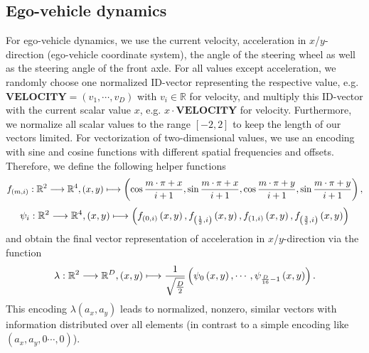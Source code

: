 \subsection{Ego-vehicle dynamics}
For ego-vehicle dynamics, we use the current velocity, acceleration in $x$/$y$-direction (ego-vehicle coordinate system), the angle of the steering wheel as well as the steering angle of the front axle.
For all values except acceleration, we randomly choose one normalized ID-vector representing the respective value, e.g. $\mathbf{VELOCITY}=\left(v_1, \cdots, v_D\right)$ with $v_i \in \mathbb{R}$ for velocity, and multiply this ID-vector with the current scalar value $x$, e.g. $x \cdot \mathbf{VELOCITY}$ for velocity.
Furthermore, we normalize all scalar values to the range $\left[-2,2\right]$ to keep the length of our vectors limited.
For vectorization of two-dimensional values, we use an encoding with sine and cosine functions with different spatial frequencies and offsets.
Therefore, we define the following helper functions
\[ f_{\left(m,i\right)}: \mathbb{R}^2 \longrightarrow \mathbb{R}^4, \left(x,y\right) \longmapsto \left(\cos\frac{m\cdot \pi + x}{i + 1}, \sin\frac{m\cdot \pi + x}{i + 1}, \cos\frac{m\cdot \pi + y}{i + 1}, \sin\frac{m\cdot \pi + y}{i + 1}\right),
\]
\[
\psi_i: \mathbb{R}^2 \longrightarrow \mathbb{R}^4, \left(x,y\right) \longmapsto \left(f_{\left(0,i\right)}\left(x,y\right), f_{\left(\frac{1}{2},i\right)}\left(x,y\right), f_{\left(1,i\right)}\left(x,y\right), f_{\left(\frac{3}{2},i\right)}\left(x,y\right)\right)
\]
and obtain the final vector representation of acceleration in $x$/$y$-direction via the function
\[
\lambda: \mathbb{R}^2 \longrightarrow \mathbb{R}^D, \left(x,y\right) \longmapsto \frac{1}{\sqrt{\frac{D}{2}}}\left(\psi_0\left(x,y\right), \cdots, \psi_{\frac{D}{16}-1}\left(x,y\right)\right).
\]
This encoding $\lambda\left(a_x, a_y\right)$ leads to normalized, nonzero, similar vectors with information distributed over all elements (in contrast to a simple encoding like $\left(a_x, a_y, 0 \cdots, 0\right)$).\\
